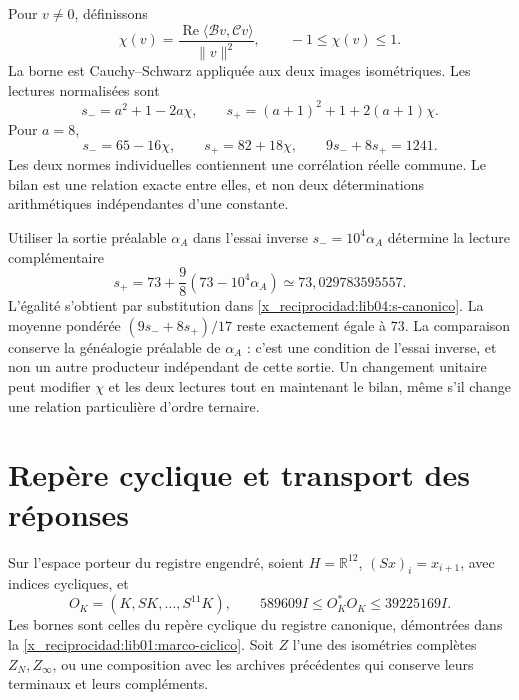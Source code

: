 Pour \(v\neq0\), définissons
\begin{equation}
 \chi(v)=\frac{\operatorname{Re}\langle\mathcal Bv,\mathcal Cv\rangle}
                      {\|v\|^2},\qquad -1\leq\chi(v)\leq1.
 \label{x_reciprocidad:lib04:chi}
\end{equation}
La borne est Cauchy--Schwarz appliquée aux deux images isométriques.
Les lectures normalisées sont
\begin{equation}
 s_-=a^2+1-2a\chi,\qquad
 s_+=(a+1)^2+1+2(a+1)\chi.
 \label{x_reciprocidad:lib04:s-pm}
\end{equation}
Pour \(a=8\),
\begin{equation}
 s_-=65-16\chi,\qquad s_+=82+18\chi,\qquad
 9s_-+8s_+=1241.
 \label{x_reciprocidad:lib04:s-canonico}
\end{equation}
Les deux normes individuelles contiennent une corrélation réelle commune. Le bilan est une relation exacte entre elles, et non deux déterminations arithmétiques indépendantes d'une constante.

Utiliser la sortie préalable \(\alpha_A\) dans l’essai inverse
\(s_-=10^4\alpha_A\) détermine la lecture complémentaire
\begin{equation}
 s_+=73+\frac98(73-10^4\alpha_A)
       \simeq73{,}029783595557.
 \label{x_reciprocidad:lib04:ensayo-alpha}
\end{equation}
L’égalité s’obtient par substitution dans
\eqref{x_reciprocidad:lib04:s-canonico}. La moyenne pondérée
\((9s_-+8s_+)/17\) reste exactement égale à \(73\).
La comparaison conserve la généalogie préalable de \(\alpha_A\) : c’est
une condition de l’essai inverse, et non un autre producteur indépendant de
cette sortie. Un changement unitaire peut modifier \(\chi\) et les deux
lectures tout en maintenant le bilan, même s’il change une relation particulière
d’ordre ternaire.

\section{Repère cyclique et transport des réponses}
\label{x_reciprocidad:lib04:marco}

Sur l'espace porteur du registre engendré, soient \(H=\mathbb R^{12}\), \((Sx)_i=x_{i+1}\), avec indices cycliques, et
\begin{equation}
 O_K=(K,SK,\ldots,S^{11}K),\qquad
 589609I\leq O_K^*O_K\leq39225169I.
 \label{x_reciprocidad:lib04:gram-k}
\end{equation}
Les bornes sont celles du repère cyclique du registre canonique,
démontrées dans la \cref{x_reciprocidad:lib01:marco-ciclico}.
Soit \(Z\) l’une des isométries complètes
\(Z_N,Z_\infty\), ou une composition avec les archives précédentes
qui conserve leurs terminaux et leurs compléments.

